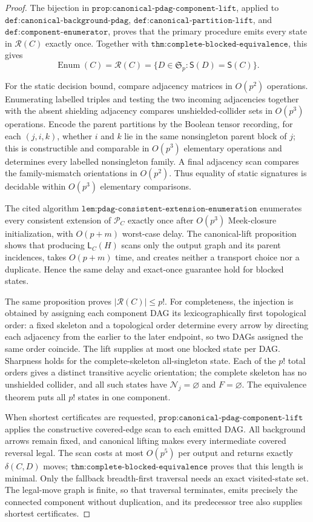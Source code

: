 \documentclass{article}
\begin{document}
\begin{proof}
The bijection in \(\texttt{prop:canonical-pdag-component-lift}\), applied to \(\texttt{def:canonical-background-pdag}\), \(\texttt{def:canonical-partition-lift}\), and \(\texttt{def:component-enumerator}\), proves that the primary procedure emits every state in \(\mathcal R(C)\) exactly once. Together with \(\texttt{thm:complete-blocked-equivalence}\), this gives
\[
 \operatorname{Enum}(C)=\mathcal R(C)
 =\{D\in\mathfrak S_p:\mathsf S(D)=\mathsf S(C)\}.
\]

For the static decision bound, compare adjacency matrices in \(O(p^2)\) operations. Enumerating labelled triples and testing the two incoming adjacencies together with the absent shielding adjacency compares unshielded-collider sets in \(O(p^3)\) operations. Encode the parent partitions by the Boolean tensor recording, for each \((j,i,k)\), whether \(i\) and \(k\) lie in the same nonsingleton parent block of \(j\); this is constructible and comparable in \(O(p^3)\) elementary operations and determines every labelled nonsingleton family. A final adjacency scan compares the family-mismatch orientations in \(O(p^2)\). Thus equality of static signatures is decidable within \(O(p^3)\) elementary comparisons.

The cited algorithm \(\texttt{lem:pdag-consistent-extension-enumeration}\) enumerates every consistent extension of \(\mathcal P_C\) exactly once after \(O(p^3)\) Meek-closure initialization, with \(O(p+m)\) worst-case delay. The canonical-lift proposition shows that producing \(\mathsf L_C(H)\) scans only the output graph and its parent incidences, takes \(O(p+m)\) time, and creates neither a transport choice nor a duplicate. Hence the same delay and exact-once guarantee hold for blocked states.

The same proposition proves \(|\mathcal R(C)|\leq p!\). For completeness, the injection is obtained by assigning each component DAG its lexicographically first topological order: a fixed skeleton and a topological order determine every arrow by directing each adjacency from the earlier to the later endpoint, so two DAGs assigned the same order coincide. The lift supplies at most one blocked state per DAG. Sharpness holds for the complete-skeleton all-singleton state. Each of the \(p!\) total orders gives a distinct transitive acyclic orientation; the complete skeleton has no unshielded collider, and all such states have \(\mathcal N_j=\varnothing\) and \(F=\varnothing\). The equivalence theorem puts all \(p!\) states in one component.

When shortest certificates are requested, \(\texttt{prop:canonical-pdag-component-lift}\) applies the constructive covered-edge scan to each emitted DAG. All background arrows remain fixed, and canonical lifting makes every intermediate covered reversal legal. The scan costs at most \(O(p^5)\) per output and returns exactly \(\delta(C,D)\) moves; \(\texttt{thm:complete-blocked-equivalence}\) proves that this length is minimal. Only the fallback breadth-first traversal needs an exact visited-state set. The legal-move graph is finite, so that traversal terminates, emits precisely the connected component without duplication, and its predecessor tree also supplies shortest certificates.
\end{proof}
\end{document}

